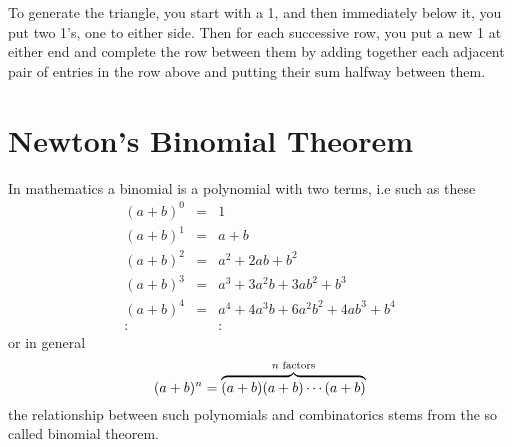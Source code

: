 To generate the triangle, you start with a 1, and then immediately below it, you put two 1’s, one to either side. Then for each successive row, you put a new 1 at either end and complete the row between them by adding together each adjacent pair of entries in the row above and putting their sum halfway between them.


\newpage
\section{Newton's Binomial Theorem}
In mathematics a binomial is a polynomial with two terms, i.e such as these
\[\begin{array}{lcl}
(a + b)^0 &=& 1\\
(a + b)^1 &=& a + b \\
(a + b)^2 &=& a^2 + 2ab + b^2 \\
(a + b)^3 &=& a^3 + 3a^2b + 3ab^2 + b^3 \\
(a + b)^4 &=& a^4 + 4a^3b + 6a^2b^2 + 4ab^3 + b^4 \\
:                &   & :
\end{array}\]
or in general
\[
(a+b)^n = \overbrace{(a+b)(a+b)\cdots(a+b)}^{n\textnormal{ factors}}
\]
the relationship between such polynomials and combinatorics stems from the so called binomial theorem.


